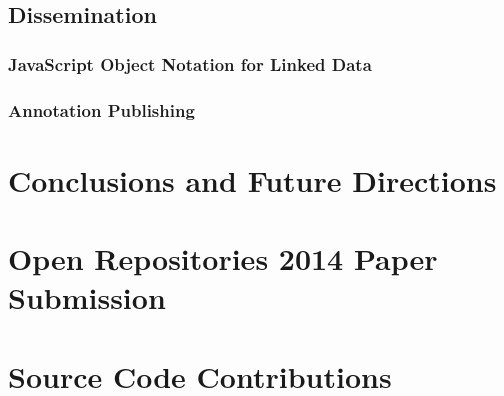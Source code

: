 \documentclass[12pt,a4paper]{report}
\begin{document}
    \subsection{Dissemination}
      \label{sec:diss}
      

      \subsubsection{JavaScript Object Notation for Linked Data}
        \label{sec:json}
        

      \clearpage

      \subsubsection{Annotation Publishing}
        \label{sec:pub}
        


  \section{Conclusions and Future Directions}
    \label{sec:outro}
    

  \cleardoublepage

  
  

  \cleardoublepage

  \appendixpage
  \addappheadtotoc

  \appendix
    \section{Open Repositories 2014 Paper Submission}
      \label{apx:or2014}
      

    \cleardoublepage

    \section{Source Code Contributions}
      \label{apx:code}
      

\end{document}
